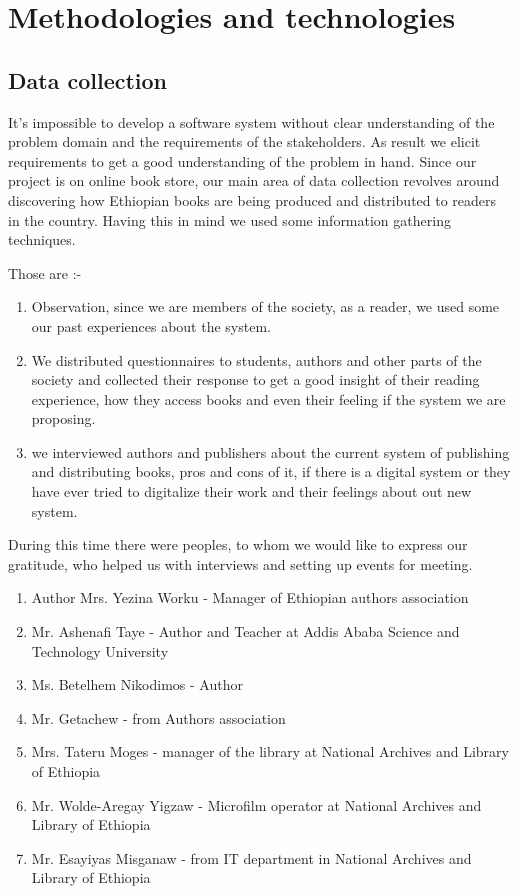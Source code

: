 	\section{Methodologies and technologies}
		\subsection{Data collection}

It's impossible to develop a software system without clear understanding of the problem domain and the requirements of the stakeholders. As result we elicit requirements to get a good understanding of the problem in hand. Since our project is on online book store, our main area of data collection revolves around discovering how Ethiopian books are being produced and distributed to readers in the country. Having this in mind we used some information gathering techniques.

Those are :-

\begin{enumerate}
\item Observation, since we are members of the society, as a reader, we used some our past experiences about the system.
\item We distributed questionnaires to students, authors and other parts of the society and collected their response to get a good insight of their reading experience, how they access books and even their feeling if the system we are proposing.
\item we interviewed authors and publishers about the current system of publishing and distributing books, pros and cons of it, if there is a digital system or they have ever tried to digitalize their work and their feelings about out new system. 
\end{enumerate}


During this time there were peoples, to whom we would like to express our gratitude, who helped us with interviews and setting up events for meeting.  

\begin{enumerate}
\item Author Mrs. Yezina Worku - Manager of Ethiopian authors association
\item Mr. Ashenafi Taye - Author and Teacher at Addis Ababa Science and Technology University
\item Ms. Betelhem Nikodimos - Author
\item Mr. Getachew - from Authors association
\item Mrs. Tateru Moges - manager of the library at National Archives and Library of Ethiopia
\item Mr. Wolde-Aregay Yigzaw - Microfilm operator at National Archives and Library of Ethiopia
\item Mr. Esayiyas Misganaw - from IT department in National Archives and Library of Ethiopia
\end{enumerate}

